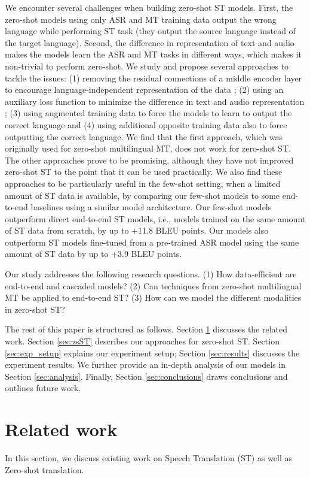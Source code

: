 \documentclass[conference]{IEEEtran}
\begin{document}
	We encounter several challenges when building zero-shot ST models. First, the zero-shot models using only ASR and MT training data output the wrong language while performing ST task (they output the source language instead of the target language). Second, the difference in representation of text and audio makes the models learn the ASR and MT tasks in different ways, which makes it non-trivial to perform zero-shot. We study and propose several approaches to tackle the issues: (1) removing the residual connections of a middle encoder layer to encourage language-independent representation of the data \cite{DEPI}; (2) using an auxiliary loss function to minimize the difference in text and audio representation \cite{ZS-Quan}; (3) using augmented training data to force the models to learn to output the correct language and (4) using additional opposite training data also to force outputting the correct language. We find that the first approach, which was originally used for zero-shot multilingual MT, does not work for zero-shot ST. The other approaches prove to be promising, although they have not improved zero-shot ST to the point that it can be used practically. We also find these approaches to be particularly useful in the few-shot setting, when a limited amount of ST data is available, by comparing our few-shot models to some end-to-end baselines using a similar model architecture. Our few-shot models outperform direct end-to-end ST models, i.e., models trained on the same amount of ST data from scratch, by up to +11.8 BLEU points. Our models also outperform ST models fine-tuned from a pre-trained ASR model using the same amount of ST data by up to +3.9 BLEU points. 
	
	Our study addresses the following research questions. (1) How data-efficient are end-to-end and cascaded models? (2) Can techniques from zero-shot multilingual MT be applied to end-to-end ST? (3) How can we model the different modalities in zero-shot ST?
	
	The rest of this paper is structured as follows. Section \ref{sec:RelatedWork} discusses the related work. Section \ref{sec:zsST} describes our approaches for zero-shot ST. Section \ref{sec:exp_setup} explains our experiment setup; Section \ref{sec:results} discusses the experiment results. We further provide an in-depth analysis of our models in Section \ref{sec:analysis}. Finally, Section \ref{sec:conclusions} draws conclusions and outlines future work.
	
	
	\section{Related work} \label{sec:RelatedWork}
	In this section, we discuss existing work on Speech Translation (ST) as well as Zero-shot translation.
	
\end{document}
